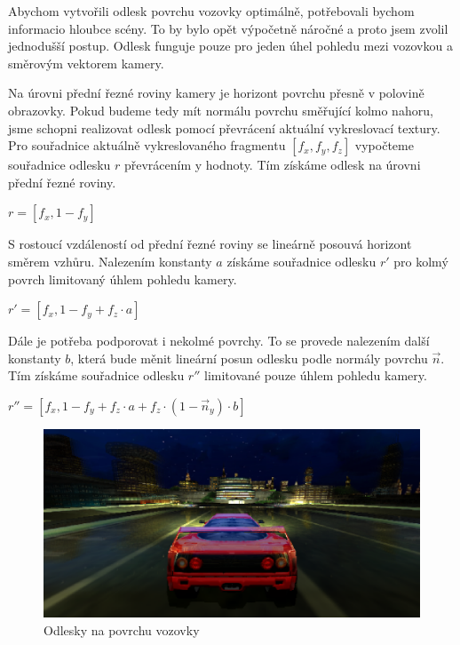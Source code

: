 \documentclass[11pt,twoside,a4paper]{book}
\begin{document}
Abychom vytvořili odlesk povrchu vozovky optimálně, potřebovali bychom informaci\linebreak o hloubce scény. To by bylo opět výpočetně náročné a proto jsem zvolil jednodušší postup. Odlesk funguje pouze pro jeden úhel pohledu mezi vozovkou a směrovým vektorem kamery.

Na úrovni přední řezné roviny kamery je horizont povrchu přesně v polovině obrazovky. Pokud budeme tedy mít normálu povrchu směřující kolmo nahoru, jsme schopni realizovat odlesk pomocí převrácení aktuální vykreslovací textury. Pro souřadnice aktuálně vykreslovaného fragmentu $[f_x, f_y, f_z]$ vypočteme souřadnice odlesku $r$ převrácením y hodnoty. Tím získáme odlesk na úrovni  přední řezné roviny.
\begin{center}
$r = [f_x, 1 - f_y]$
\end{center}

S rostoucí vzdáleností od přední řezné roviny se lineárně posouvá horizont směrem vzhůru. Nalezením konstanty $a$ získáme souřadnice odlesku $r'$ pro kolmý povrch limitovaný úhlem pohledu kamery.
\begin{center}
$r' = [f_x, 1 - f_y + f_z \cdot a]$
\end{center}

Dále je potřeba podporovat i nekolmé povrchy. To se provede nalezením další konstanty $b$, která bude měnit lineární posun odlesku podle normály povrchu $\vec{n}$. Tím získáme souřadnice odlesku $r''$ limitované pouze úhlem pohledu kamery.
\begin{center}
$r'' = [f_x, 1 - f_y + f_z \cdot a + f_z \cdot (1 - \vec{n}_y) \cdot b]$
\end{center}

\begin{center}
\begin{figure}[h!]
\includegraphics[width=140mm]{figures/reflect-horizont.png}
\caption{Odlesky na povrchu vozovky}
\end{figure}
\end{center}
\end{document}

